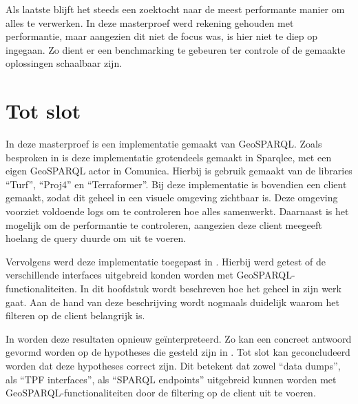 Als laatste blijft het steeds een zoektocht naar de meest performante manier om alles te verwerken. In deze masterproef werd rekening gehouden met performantie, maar aangezien dit niet de focus was, is hier niet te diep op ingegaan. Zo dient er een benchmarking te gebeuren ter controle of de gemaakte oplossingen schaalbaar zijn.

\section{Tot slot}
In deze masterproef is een implementatie gemaakt van GeoSPARQL. Zoals besproken in  is deze implementatie grotendeels gemaakt in Sparqlee, met een eigen GeoSPARQL actor in Comunica. Hierbij is gebruik gemaakt van de libraries ``Turf'', ``Proj4'' en ``Terraformer''. Bij deze implementatie is bovendien een client gemaakt, zodat dit geheel in een visuele omgeving zichtbaar is. Deze omgeving voorziet voldoende logs om te controleren hoe alles samenwerkt. Daarnaast is het mogelijk om de performantie te controleren, aangezien deze client meegeeft hoelang de query duurde om uit te voeren. 

Vervolgens werd deze implementatie toegepast in . Hierbij werd getest of de verschillende interfaces uitgebreid konden worden met GeoSPARQL-functionaliteiten. In dit hoofdstuk wordt beschreven hoe het geheel in zijn werk gaat. Aan de hand van deze beschrijving wordt nogmaals duidelijk waarom het filteren op de client belangrijk is. 

In  worden deze resultaten opnieuw geïnterpreteerd. Zo kan een concreet antwoord gevormd worden op de hypotheses die gesteld zijn in . Tot slot kan geconcludeerd worden dat deze hypotheses correct zijn. Dit betekent dat zowel ``data dumps'', als ``TPF interfaces'', als ``SPARQL endpoints'' uitgebreid kunnen worden met GeoSPARQL-functionaliteiten door de filtering op de client uit te voeren.